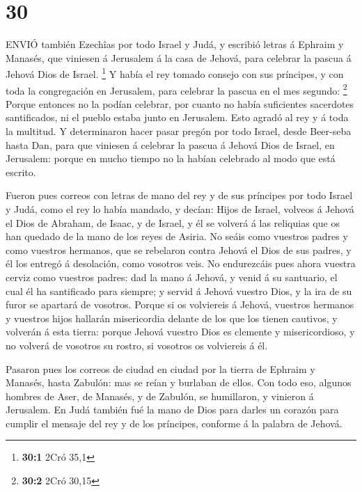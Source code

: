 \hypertarget{section-29}{%
\section{30}\label{section-29}}

 ENVIÓ también Ezechîas por todo Israel y Judá, y escribió
letras á Ephraim y Manasés, que viniesen á Jerusalem á la casa de
Jehová, para celebrar la pascua á Jehová Dios de Israel. \footnote{\textbf{30:1}
  2Cró 35,1}  Y había el rey tomado consejo con sus
príncipes, y con toda la congregación en Jerusalem, para celebrar la
pascua en el mes segundo: \footnote{\textbf{30:2} 2Cró 30,15}
 Porque entonces no la podían celebrar, por cuanto no había
suficientes sacerdotes santificados, ni el pueblo estaba junto en
Jerusalem.  Esto agradó al rey y á toda la multitud.
 Y determinaron hacer pasar pregón por todo Israel, desde
Beer-seba hasta Dan, para que viniesen á celebrar la pascua á Jehová
Dios de Israel, en Jerusalem: porque en mucho tiempo no la habían
celebrado al modo que está escrito.

 Fueron pues correos con letras de mano del rey y de sus
príncipes por todo Israel y Judá, como el rey lo había mandado, y
decían: Hijos de Israel, volveos á Jehová el Dios de Abraham, de Isaac,
y de Israel, y él se volverá á las reliquias que os han quedado de la
mano de los reyes de Asiria.  No seáis como vuestros padres
y como vuestros hermanos, que se rebelaron contra Jehová el Dios de sus
padres, y él los entregó á desolación, como vosotros veis. 
No endurezcáis pues ahora vuestra cerviz como vuestros padres: dad la
mano á Jehová, y venid á su santuario, el cual él ha santificado para
siempre; y servid á Jehová vuestro Dios, y la ira de su furor se
apartará de vosotros.  Porque si os volviereis á Jehová,
vuestros hermanos y vuestros hijos hallarán misericordia delante de los
que los tienen cautivos, y volverán á esta tierra: porque Jehová vuestro
Dios es clemente y misericordioso, y no volverá de vosotros su rostro,
si vosotros os volviereis á él.

 Pasaron pues los correos de ciudad en ciudad por la tierra
de Ephraim y Manasés, hasta Zabulón: mas se reían y burlaban de ellos.
 Con todo eso, algunos hombres de Aser, de Manasés, y de
Zabulón, se humillaron, y vinieron á Jerusalem.  En Judá
también fué la mano de Dios para darles un corazón para cumplir el
mensaje del rey y de los príncipes, conforme á la palabra de Jehová.

